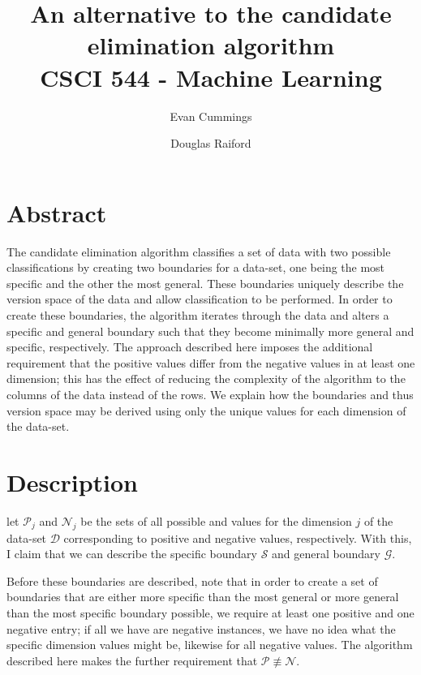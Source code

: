 
\DeclareMathOperator*{\argmax}{arg\,max}

\usepackage[top=.5in, bottom=.5in, left=.5in, right=.5in]{geometry}
\usepackage{framed}
\setlength{\columnsep}{8mm}
\usepackage{natbib}


\small

\title{An alternative to the candidate elimination algorithm \\ 
\vspace{5mm} \large CSCI 544 - Machine Learning}
\author{Evan Cummings \and Douglas Raiford}

\maketitle

\section{Abstract}

The candidate elimination algorithm classifies a set of data with two possible classifications by creating two boundaries for a data-set, one being the most specific and the other the most general.  These boundaries uniquely describe the version space of the data and allow classification to be performed.  In order to create these boundaries, the algorithm iterates through the data and alters a specific and general boundary such that they become minimally more general and specific, respectively.  The approach described here imposes the additional requirement that the positive values differ from the negative values in at least one dimension; this has the effect of reducing the complexity of the algorithm to the columns of the data instead of the rows.  We explain how the boundaries and thus version space may be derived using only the unique values for each dimension of the data-set.

\section{Description}

let $\mathcal{P}_j$ and $\mathcal{N}_j$ be the sets of all possible and values for the dimension $j$ of the data-set $\mathcal{D}$ corresponding to positive and negative values, respectively.  With this, I claim that we can describe the specific boundary $\mathcal{S}$ and general boundary $\mathcal{G}$.

Before these boundaries are described, note that in order to create a set of boundaries that are either more specific than the most general or more general than the most specific boundary possible, we require at least one positive and one negative entry; if all we have are negative instances, we have no idea what the specific dimension values might be, likewise for all negative values.  The algorithm described here makes the further requirement that $\mathcal{P} \not\equiv \mathcal{N}$.

